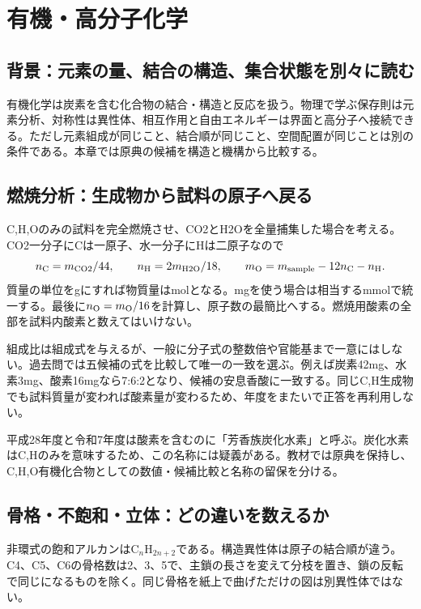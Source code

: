 \chapter{有機・高分子化学}
\section{背景：元素の量、結合の構造、集合状態を別々に読む}
有機化学は炭素を含む化合物の結合・構造と反応を扱う。物理で学ぶ保存則は元素分析、対称性は異性体、相互作用と自由エネルギーは界面と高分子へ接続できる。ただし元素組成が同じこと、結合順が同じこと、空間配置が同じことは別の条件である。本章では原典の候補を構造と機構から比較する。

\section{燃焼分析：生成物から試料の原子へ戻る}
\label{theory:organic:combustion}
C,H,Oのみの試料を完全燃焼させ、CO2とH2Oを全量捕集した場合を考える。CO2一分子にCは一原子、水一分子にHは二原子なので
\[
 n_{\rm C}=m_{\rm CO2}/44,\qquad
 n_{\rm H}=2m_{\rm H2O}/18,\qquad
 m_{\rm O}=m_{\rm sample}-12n_{\rm C}-n_{\rm H}.
\]
質量の単位をgにすれば物質量はmolとなる。mgを使う場合は相当するmmolで統一する。最後に\(n_{\rm O}=m_{\rm O}/16\)を計算し、原子数の最簡比へする。燃焼用酸素の全部を試料内酸素と数えてはいけない。

組成比は組成式を与えるが、一般に分子式の整数倍や官能基まで一意にはしない。過去問では五候補の式を比較して唯一の一致を選ぶ。例えば炭素42mg、水素3mg、酸素16mgなら7:6:2となり、候補の安息香酸に一致する。同じC,H生成物でも試料質量が変われば酸素量が変わるため、年度をまたいで正答を再利用しない。
\begin{tcolorbox}[title=原典の名称と数値を区別する]
平成28年度と令和7年度は酸素を含むのに「芳香族炭化水素」と呼ぶ。炭化水素はC,Hのみを意味するため、この名称には疑義がある。教材では原典を保持し、C,H,O有機化合物としての数値・候補比較と名称の留保を分ける。
\end{tcolorbox}

\section{骨格・不飽和・立体：どの違いを数えるか}
\label{theory:organic:structure}
非環式の飽和アルカンは\(\mathrm C_n\mathrm H_{2n+2}\)である。構造異性体は原子の結合順が違う。C4、C5、C6の骨格数は2、3、5で、主鎖の長さを変えて分枝を置き、鎖の反転で同じになるものを除く\cite{organic_isomers}。同じ骨格を紙上で曲げただけの図は別異性体ではない。

